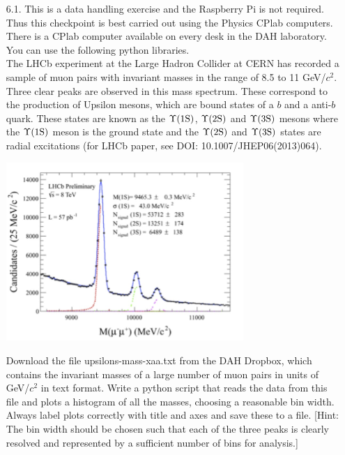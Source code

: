 \begin{enumerate}

\item [6.1.] This is a data handling exercise and the Raspberry Pi is not required.
Thus this checkpoint is best carried out using the Physics CPlab computers. 
There is a CPlab computer available on every desk in the DAH laboratory.
You can use the following python libraries. \\



The LHCb experiment at the Large Hadron Collider at CERN has recorded a sample of muon pairs with invariant masses in the range of 8.5 to 11 GeV/$c^2$. Three clear peaks are observed in this mass spectrum. These correspond to the production of Upsilon mesons, which are bound states of a $b$ and a anti-$b$ quark. These states are known as the $\Upsilon \rm (1S)$, $\Upsilon \rm (2S)$ and $\Upsilon \rm (3S)$ mesons where the $\Upsilon \rm (1S)$ meson is the ground state and the $\Upsilon \rm (2S)$  and $\Upsilon \rm (3S)$  states are radial excitations (for LHCb paper, see {DOI: 10.1007/JHEP06(2013)064).}

\begin{center}
    \includegraphics[width=9cm]{figs/mu-pair-mass}
\end{center}

Download the file upsilons-mass-xaa.txt from the DAH Dropbox, which contains the invariant masses of a large number of muon pairs in units of GeV/$c^2$ in text format. Write a python script that reads the data from this file and plots a histogram of all the masses, choosing a reasonable bin width. Always label plots correctly with title and axes and save these to a file.
[Hint: The bin width should be chosen such that each of the three peaks is clearly resolved and represented by a sufficient number of bins for analysis.]


\end{enumerate}
